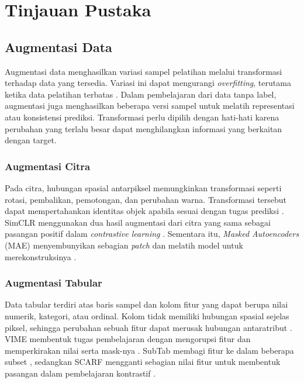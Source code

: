 \setcounter{section}{1}
\section{Tinjauan Pustaka}

\subsection{Augmentasi Data}

Augmentasi data menghasilkan variasi sampel pelatihan melalui transformasi terhadap data yang tersedia. Variasi ini dapat mengurangi \textit{overfitting}, terutama ketika data pelatihan terbatas \cite{ref1}. Dalam pembelajaran dari data tanpa label, augmentasi juga menghasilkan beberapa versi sampel untuk melatih representasi atau konsistensi prediksi. Transformasi perlu dipilih dengan hati-hati karena perubahan yang terlalu besar dapat menghilangkan informasi yang berkaitan dengan target.

\subsubsection{Augmentasi Citra}

Pada citra, hubungan spasial antarpiksel memungkinkan transformasi seperti rotasi, pembalikan, pemotongan, dan perubahan warna. Transformasi tersebut dapat mempertahankan identitas objek apabila sesuai dengan tugas prediksi \cite{ref1}. SimCLR menggunakan dua hasil augmentasi dari citra yang sama sebagai pasangan positif dalam \textit{contrastive learning} \cite{ref2}. Sementara itu, \textit{Masked Autoencoders} (MAE) menyembunyikan sebagian \textit{patch} dan melatih model untuk merekonstruksinya \cite{ref3}.

\subsubsection{Augmentasi Tabular}

Data tabular terdiri atas baris sampel dan kolom fitur yang dapat berupa nilai numerik, kategori, atau ordinal. Kolom tidak memiliki hubungan spasial sejelas piksel, sehingga perubahan sebuah fitur dapat merusak hubungan antaratribut \cite{ref4}. VIME membentuk tugas pembelajaran dengan mengorupsi fitur dan memperkirakan nilai serta mask-nya \cite{ref5}. SubTab membagi fitur ke dalam beberapa subset \cite{ref6}, sedangkan SCARF mengganti sebagian nilai fitur untuk membentuk pasangan dalam pembelajaran kontrastif \cite{ref7}.

